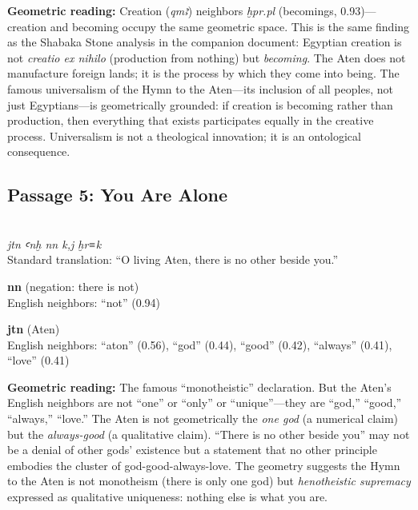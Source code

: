 \documentclass[11pt, a4paper]{article}
\newcommand{\passagehiero}[1]{{\normalfont\hierofont\fontsize{14}{17}\selectfont #1}}
\begin{document}
\medskip

{\color{insight}\textbf{Geometric reading:}} Creation (\textit{qmꜣ}) neighbors \textit{ḫpr.pl} (becomings, 0.93)---creation and becoming occupy the same geometric space. This is the same finding as the Shabaka Stone analysis in the companion document: Egyptian creation is not \textit{creatio ex nihilo} (production from nothing) but \textit{becoming}. The Aten does not manufacture foreign lands; it is the process by which they come into being. The famous universalism of the Hymn to the Aten---its inclusion of all peoples, not just Egyptians---is geometrically grounded: if creation is becoming rather than production, then everything that exists participates equally in the creative process. Universalism is not a theological innovation; it is an ontological consequence.

\subsection{Passage 5: You Are Alone}

{\color{passage}\passagehiero{𓇋𓏏𓈖𓇳 𓋹 𓈖𓈖 𓎡𓇋 𓐍𓂋𓎡}\\\medskip
\textit{\small jtn ꜥnḫ nn k,j ḫr≡k}\\
Standard translation: ``O living Aten, there is no other beside you.''}

\bigskip

\noindent\textbf{nn} (negation: there is not)\\
English neighbors: ``not'' (0.94)

\medskip

\noindent\textbf{jtn} (Aten)\\
English neighbors: ``aton'' (0.56), ``god'' (0.44), ``good'' (0.42), ``always'' (0.41), ``love'' (0.41)

\medskip

{\color{insight}\textbf{Geometric reading:}} The famous ``monotheistic'' declaration. But the Aten's English neighbors are not ``one'' or ``only'' or ``unique''---they are ``god,'' ``good,'' ``always,'' ``love.'' The Aten is not geometrically the \textit{one god} (a numerical claim) but the \textit{always-good} (a qualitative claim). ``There is no other beside you'' may not be a denial of other gods' existence but a statement that no other principle embodies the cluster of god-good-always-love. The geometry suggests the Hymn to the Aten is not monotheism (there is only one god) but \textit{henotheistic supremacy} expressed as qualitative uniqueness: nothing else is what you are.
\end{document}
